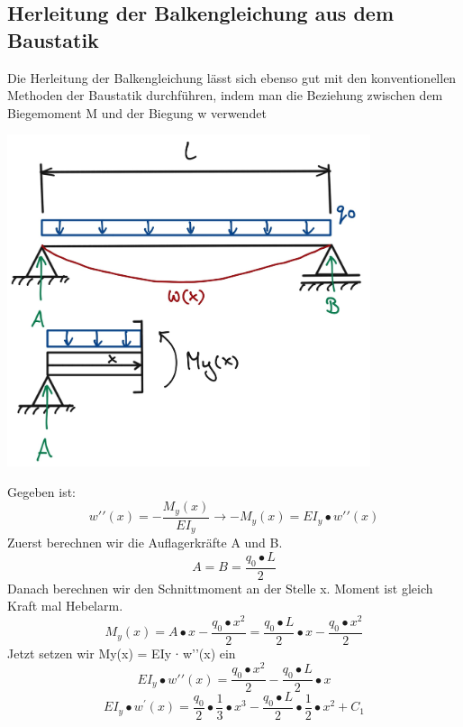\subsection{Herleitung der Balkengleichung aus dem Baustatik}
Die Herleitung der Balkengleichung lässt sich ebenso gut mit den konventionellen Methoden der Baustatik durchführen, indem man die Beziehung zwischen dem Biegemoment M und der Biegung w verwendet
\begin{center}
	\includegraphics[width=0.8\textwidth]{papers/balken/images/teil2/Herleitung_Baustatik.jpg}
\end{center}
\label{Darstellung unsere Balke mit den Auflagern A und B und der Linienlast q0.}
Gegeben ist:
\begin{equation}
	w\prime\prime(x)=
	-\frac{M_y(x)}{EI_y}
	\rightarrow-M_y(x)=
	EI_y\bullet w\prime\prime(x)
\end{equation}
Zuerst berechnen wir die Auflagerkräfte A und B.
\begin{equation}
	A=
	B=
	\frac{q_0\bullet L}{2}
\end{equation}
Danach berechnen wir den Schnittmoment an der Stelle x.
Moment ist gleich Kraft mal Hebelarm.
\begin{equation}
	M_y(x)=
	A\bullet x-\frac{q_0\bullet x^2}{2}=
	\frac{q_0\bullet L}{2}\bullet x-\frac{q_0\bullet x^2}{2}
\end{equation}
Jetzt setzen wir My(x) = EIy ∙ w’’(x) ein
\begin{equation}
	EI_y\bullet w\prime\prime(x)=
	\frac{q_0\bullet x^2}{2}-\frac{q_0\bullet L}{2}\bullet x
\end{equation}
\begin{equation}
	EI_y\bullet w^\prime\left(x\right)=
	\frac{q_0}{2}\bullet\frac{1}{3}\bullet x^3-\frac{q_0\bullet L}{2}\bullet\frac{1}{2}\bullet x^2+C_1
\end{equation}
